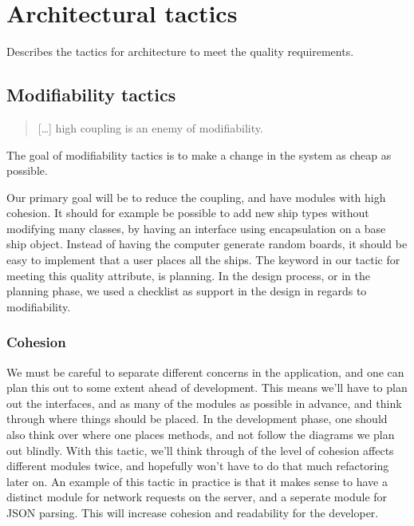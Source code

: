 \section{Architectural tactics}
Describes the tactics for architecture to meet the quality requirements.

\subsection{Modifiability tactics}
\begin{quote}
   [\ldots] high coupling is an enemy of modifiability.~\cite{progark}
\end{quote}
The goal of modifiability tactics is to make a change in the system as cheap as possible. 

Our primary goal will be to reduce the coupling, and have modules with high cohesion. It should for example be possible to add new ship types without modifying many classes, by having an interface using encapsulation on a base ship object. Instead of having the computer generate random boards, it should be easy to implement that a user places all the ships. The keyword in our tactic for meeting this quality attribute, is planning. In the design process, or in the planning phase, we used a checklist as support in the design in regards to modifiability. \cite{progark, 126-127}





\subsubsection{Cohesion}
We must be careful to separate different concerns in the application, and one can plan this out to some extent ahead of development. This means we'll have to plan out the interfaces, and as many of the modules as possible in advance, and think through where things should be placed.\cite{progark, 123} In the development phase, one should also think over where one places methods, and not follow the diagrams we plan out blindly. With this tactic, we'll think through of the level of cohesion affects different modules twice, and hopefully won't have to do that much refactoring later on. An example of this tactic in practice is that it makes sense to have a distinct module for network requests on the server, and a seperate module for JSON parsing. This will increase cohesion and readability for the developer. 

